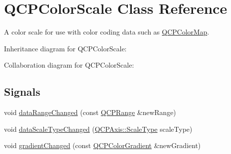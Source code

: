 \hypertarget{classQCPColorScale}{}\section{Q\+C\+P\+Color\+Scale Class Reference}
\label{classQCPColorScale}


A color scale for use with color coding data such as \hyperlink{classQCPColorMap}{Q\+C\+P\+Color\+Map}.  




Inheritance diagram for Q\+C\+P\+Color\+Scale\+:


Collaboration diagram for Q\+C\+P\+Color\+Scale\+:
\subsection*{Signals}
\begin{DoxyCompactItemize}
\item 
void \hyperlink{classQCPColorScale_a685717490a6aa83c5e711a4f34e837f9}{data\+Range\+Changed} (const \hyperlink{classQCPRange}{Q\+C\+P\+Range} \&new\+Range)
\item 
void \hyperlink{classQCPColorScale_a61558b962f7791ff2f15a565dcf60181}{data\+Scale\+Type\+Changed} (\hyperlink{classQCPAxis_a36d8e8658dbaa179bf2aeb973db2d6f0}{Q\+C\+P\+Axis\+::\+Scale\+Type} scale\+Type)
\item 
void \hyperlink{classQCPColorScale_a5e5f8c5626242c8f7308bfab74d3d989}{gradient\+Changed} (const \hyperlink{classQCPColorGradient}{Q\+C\+P\+Color\+Gradient} \&new\+Gradient)
\end{DoxyCompactItemize}

